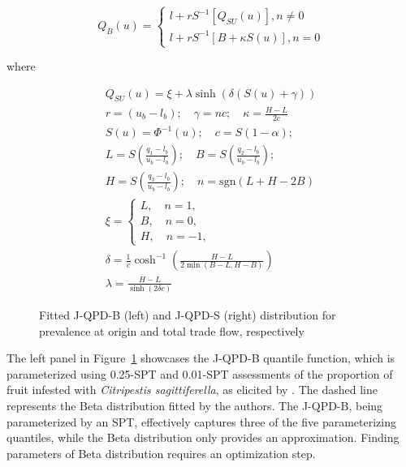 \documentclass[
  fleqn,
  deca,
  blindrev
]{informs4}
\begin{document}
\[
Q_B(u)=
\begin{cases}
l+rS^{-1}\left[Q_{SU}(u)\right], n\neq0\\
l+rS^{-1}\left[B+\kappa S(u)\right],n=0
\end{cases}
\]

where

\[
\begin{gathered}
Q_{SU}(u) = \xi + \lambda\sinh(\delta(S(u) + \gamma))\\
r=(u_b-l_b); \quad \gamma=nc; \quad \kappa=\frac{H-L}{2c}\\
S(u)=\Phi^{-1}(u); \quad c=S(1-\alpha);\\
L=S\left(\frac{q_1-l_b}{u_b-l_b}\right); \quad  B=S\left(\frac{q_2-l_b}{u_b-l_b}\right);\\
H=S\left(\frac{q_3-l_b}{u_b-l_b}\right); \quad n=\text{sgn}(L+H-2B)\\
\xi=\begin{cases}L, \quad n=1,\\
B, \quad n=0,\\
H, \quad n=-1,\end{cases}\\
\delta=\frac{1}{c}\cosh^{-1}\left(\frac{H-L}{2\min(B-L,H-B)}\right)\\
\lambda=\frac{H-L}{\sinh(2\delta c)}
\end{gathered}
\]

\begin{figure}


\caption{\label{fig-jqpd1}Fitted J-QPD-B (left) and J-QPD-S (right)
distribution for prevalence at origin and total trade flow,
respectively}

\end{figure}%

The left panel in Figure~\ref{fig-jqpd1} showcases the J-QPD-B quantile
function, which is parameterized using 0.25-SPT and 0.01-SPT assessments
of the proportion of fruit infested with \emph{Citripestis
sagittiferella}, as elicited by
\citep{efsa2023RiskAssessmentCitripestis}. The dashed line represents
the Beta distribution fitted by the authors. The J-QPD-B, being
parameterized by an SPT, effectively captures three of the five
parameterizing quantiles, while the Beta distribution only provides an
approximation. Finding parameters of Beta distribution requires an
optimization step.
\end{document}

